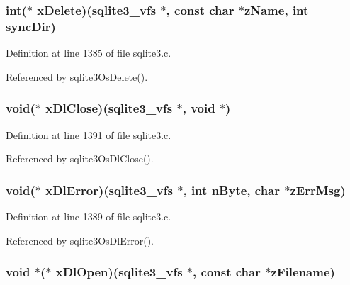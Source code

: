 \subsubsection[{x\+Delete}]{\setlength{\rightskip}{0pt plus 5cm}int($\ast$ x\+Delete)({\bf sqlite3\+\_\+vfs} $\ast$, const char $\ast${\bf z\+Name}, int sync\+Dir)}\label{structsqlite3__vfs_a912173a4206a6fb4d7ae9e76420a8596}


Definition at line 1385 of file sqlite3.\+c.



Referenced by sqlite3\+Os\+Delete().

\hypertarget{structsqlite3__vfs_a9afef84db68e33bf6d94add4a8a7b24f}{}
\subsubsection[{x\+Dl\+Close}]{\setlength{\rightskip}{0pt plus 5cm}void($\ast$ x\+Dl\+Close)({\bf sqlite3\+\_\+vfs} $\ast$, void $\ast$)}\label{structsqlite3__vfs_a9afef84db68e33bf6d94add4a8a7b24f}


Definition at line 1391 of file sqlite3.\+c.



Referenced by sqlite3\+Os\+Dl\+Close().

\hypertarget{structsqlite3__vfs_a2a682fd5ad29e633f65441e7147c6b38}{}
\subsubsection[{x\+Dl\+Error}]{\setlength{\rightskip}{0pt plus 5cm}void($\ast$ x\+Dl\+Error)({\bf sqlite3\+\_\+vfs} $\ast$, int n\+Byte, char $\ast$z\+Err\+Msg)}\label{structsqlite3__vfs_a2a682fd5ad29e633f65441e7147c6b38}


Definition at line 1389 of file sqlite3.\+c.



Referenced by sqlite3\+Os\+Dl\+Error().

\hypertarget{structsqlite3__vfs_a80e5a29a66984df865d51395dd024508}{}
\subsubsection[{x\+Dl\+Open}]{\setlength{\rightskip}{0pt plus 5cm}void $\ast$($\ast$ x\+Dl\+Open)({\bf sqlite3\+\_\+vfs} $\ast$, const char $\ast$z\+Filename)}\label{structsqlite3__vfs_a80e5a29a66984df865d51395dd024508}


